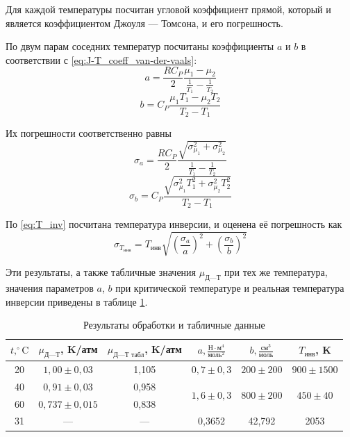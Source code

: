 \documentclass[12pt]{article}
\begin{document}
	Для каждой температуры посчитан угловой коэффициент прямой, который и является коэффициентом Джоуля --- Томсона, и его погрешность.
	
	По двум парам соседних температур посчитаны коэффициенты $a$ и $b$ в соответствии с \eqref{eq:J-T_coeff_van-der-vaals}:
	\begin{equation}
	\label{coeff_a_from_exp}
	a = \frac{R C_P}{2} \frac{\mu_1 - \mu_2}{\frac{1}{T_1}-\frac{1}{T_2}}
	\end{equation}
	\begin{equation}
	\label{coeff_b_from_exp}
	b = C_P \frac{\mu_1 T_1 - \mu_2 T_2}{T_2 - T_1}
	\end{equation}
	
	Их погрешности соответственно равны
	\begin{equation}
	\label{coeff_a_sigma}
	\sigma_a = \frac{R C_P}{2} \frac{\sqrt{\sigma^2_{\mu_1} + \sigma^2_{\mu_2}}}{\frac{1}{T_1}-\frac{1}{T_2}}
	\end{equation}
	\begin{equation}
	\label{coeff_b_sigma}
	\sigma_b = C_P \frac{\sqrt{\sigma^2_{\mu_1} T_1^2 + \sigma^2_{\mu_2} T_2^2}}{T_2 - T_1}
	\end{equation}
	
	По \eqref{eq:T_inv} посчитана температура инверсии, и оценена её погрешность как
	\begin{equation}
	\label{eq:T_inv_sigma}
	\sigma_{T_\text{инв}}=T_\text{инв} \sqrt{\left( \frac{\sigma_a}{a} \right)^2 + \left( \frac{\sigma_b}{b} \right)^2}
	\end{equation}
	
	Эти результаты, а также табличные значения $\mu_\text{Д---Т}$ при тех же температура, значения параметров $a$, $b$ при критической температуре и реальная температура инверсии приведены в таблице \ref{tbl:proc_res}.
	
	\begin{table}
	\caption{Результаты обработки и табличные данные}
	\label{tbl:proc_res}
	\begin{center}
	\begin{tabular}{|c|c|c|c|c|c|}
	\hline
	$t, ^\circ\text{C}$ & $\mu_\text{Д---Т}$, K/атм & $\mu_\text{Д---Т табл}$, K/атм & $a, \frac{\text{Н}\cdot \text{м}^4}{\text{моль}^2}$ & $b, \frac{\text{см}^3}{\text{моль}}$ & $T_\text{инв}$, K \\
	\hline
	20 & $1{,}00\pm 0{,}03$ & 1,105 & \multirow{2}{*}{$0{,}7\pm 0{,}3$} & \multirow{2}{*}{$200\pm 200$} & \multirow{2}{*}{$900\pm 1500$} \\
	\multirow{2}{*}{40} & \multirow{2}{*}{$0{,}91\pm 0{,}03$} & \multirow{2}{*}{0,958} & & & \\
		&	&	&	\multirow{2}{*}{$1{,}6\pm 0{,}3$} & \multirow{2}{*}{$800\pm 200$} & \multirow{2}{*}{$450\pm 40$} \\
	60 & $0{,}737\pm 0{,}015$ & 0,838 & & & \\
	\hline
	31 & --- & --- & 0,3652 & 42,792 & 2053 \\
	\hline
	\end{tabular}
	\end{center}
	\end{table}
	
\end{document}
